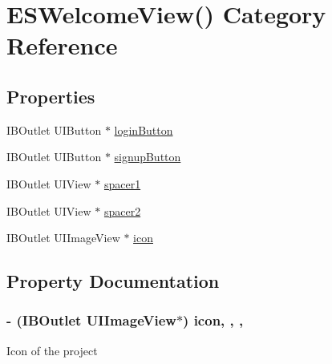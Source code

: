 \hypertarget{category_e_s_welcome_view_07_08}{}\section{E\+S\+Welcome\+View() Category Reference}
\label{category_e_s_welcome_view_07_08}
\subsection*{Properties}
\begin{DoxyCompactItemize}
\item 
I\+B\+Outlet U\+I\+Button $\ast$ \hyperlink{category_e_s_welcome_view_07_08_ae486c36ac49e2cd1fd98eea73bb0d5df}{login\+Button}
\item 
I\+B\+Outlet U\+I\+Button $\ast$ \hyperlink{category_e_s_welcome_view_07_08_ac9cc49124302fe4276fc0accb0eedf04}{signup\+Button}
\item 
I\+B\+Outlet U\+I\+View $\ast$ \hyperlink{category_e_s_welcome_view_07_08_a53b775e24fc03afd12a561eaa1bb699f}{spacer1}
\item 
I\+B\+Outlet U\+I\+View $\ast$ \hyperlink{category_e_s_welcome_view_07_08_af73d29cd2bdc0af2de46ffa4336fcb1d}{spacer2}
\item 
I\+B\+Outlet U\+I\+Image\+View $\ast$ \hyperlink{category_e_s_welcome_view_07_08_a4cf565ff4b901eda4a88c786892d210c}{icon}
\end{DoxyCompactItemize}


\subsection{Property Documentation}
\hypertarget{category_e_s_welcome_view_07_08_a4cf565ff4b901eda4a88c786892d210c}{}
\subsubsection[{icon}]{\setlength{\rightskip}{0pt plus 5cm}-\/ (I\+B\+Outlet U\+I\+Image\+View$\ast$) icon\hspace{0.3cm}{\ttfamily [read]}, {\ttfamily [write]}, {\ttfamily [nonatomic]}, {\ttfamily [strong]}}\label{category_e_s_welcome_view_07_08_a4cf565ff4b901eda4a88c786892d210c}
Icon of the project \hypertarget{category_e_s_welcome_view_07_08_ae486c36ac49e2cd1fd98eea73bb0d5df}{}
